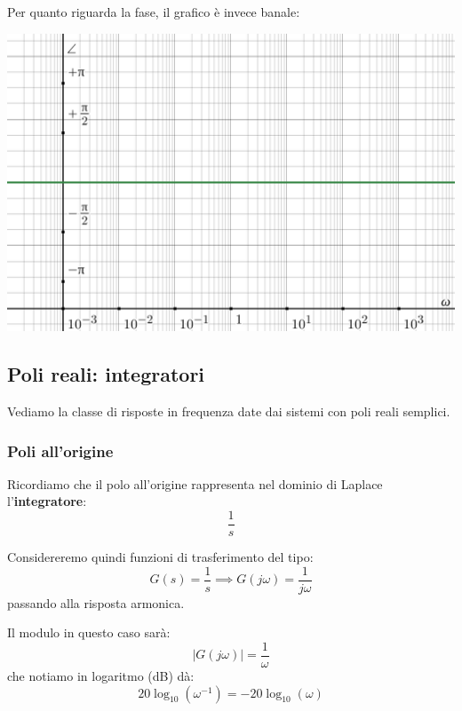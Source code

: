 \documentclass[a4paper,11pt]{article}
\begin{document}
\par\medskip

Per quanto riguarda la fase, il grafico è invece banale:
\begin{center}
	\includegraphics[scale=0.3]{../figures/costant_bode/phase.png}
\end{center}

\subsection{Poli reali: integratori}
Vediamo la classe di risposte in frequenza date dai sistemi con poli reali semplici.

\subsubsection{Poli all'origine}
Ricordiamo che il polo all'origine rappresenta nel dominio di Laplace l'\textbf{integratore}:
$$
\frac{1}{s}
$$

Considereremo quindi funzioni di trasferimento del tipo:
$$
G(s) = \frac{1}{s} \implies G(j \omega) = \frac{1}{j\omega}
$$
passando alla risposta armonica.

Il modulo in questo caso sarà:
$$
|G(j\omega)| = \frac{1}{\omega} 
$$
che notiamo in logaritmo (dB) dà:
$$
20 \log_{10} \left( \omega^{-1} \right) = - 20 \log_{10} (\omega)
$$

\par\medskip
\end{document}

